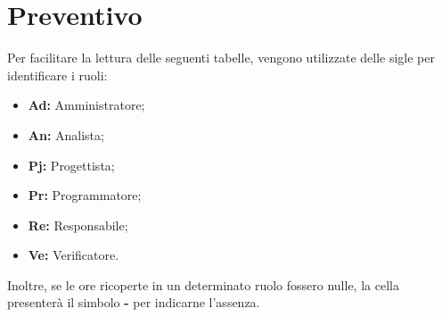 \section{Preventivo}
Per facilitare la lettura delle seguenti tabelle, vengono utilizzate delle sigle 
per identificare i ruoli:
\begin{itemize}
\item \textbf{Ad:} Amministratore;
\item \textbf{An:} Analista;
\item \textbf{Pj:} Progettista;
\item \textbf{Pr:} Programmatore;
\item \textbf{Re:} Responsabile;
\item \textbf{Ve:} Verificatore.
\end{itemize}

Inoltre, se le ore ricoperte in un determinato ruolo fossero nulle, la cella 
presenterà il simbolo \textbf{-} per indicarne l'assenza. 

